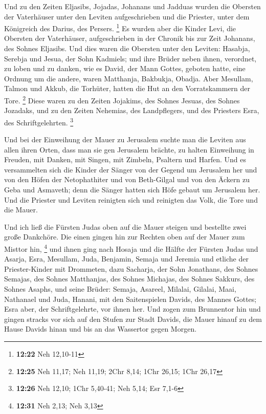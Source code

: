  Und zu den Zeiten Eljasibs, Jojadas, Johanans und Jadduas
wurden die Obersten der Vaterhäuser unter den Leviten aufgeschrieben und
die Priester, unter dem Königreich des Darius, des Persers. \footnote{\textbf{12:22}
  Neh 12,10-11}  Es wurden aber die Kinder Levi, die
Obersten der Vaterhäuser, aufgeschrieben in der Chronik bis zur Zeit
Johanans, des Sohnes Eljasibs.  Und dies waren die Obersten
unter den Leviten: Hasabja, Serebja und Jesua, der Sohn Kadmiels; und
ihre Brüder neben ihnen, verordnet, zu loben und zu danken, wie es
David, der Mann Gottes, geboten hatte, eine Ordnung um die andere,
 waren Matthanja, Bakbukja, Obadja. Aber Mesullam, Talmon
und Akkub, die Torhüter, hatten die Hut an den Vorratskammern der Tore.
\footnote{\textbf{12:25} Neh 11,17; Neh 11,19; 2Chr 8,14; 1Chr 26,15;
  1Chr 26,17}  Diese waren zu den Zeiten Jojakims, des
Sohnes Jesuas, des Sohnes Jozadaks, und zu den Zeiten Nehemias, des
Landpflegers, und des Priesters Esra, des Schriftgelehrten. \footnote{\textbf{12:26}
  Neh 12,10; 1Chr 5,40-41; Neh 5,14; Esr 7,1-6}

 Und bei der Einweihung der Mauer zu Jerusalem suchte man
die Leviten aus allen ihren Orten, dass man sie gen Jerusalem brächte,
zu halten Einweihung in Freuden, mit Danken, mit Singen, mit Zimbeln,
Psaltern und Harfen.  Und es versammelten sich die Kinder
der Sänger von der Gegend um Jerusalem her und von den Höfen der
Netophathiter  und von Beth-Gilgal und von den Äckern zu
Geba und Asmaveth; denn die Sänger hatten sich Höfe gebaut um Jerusalem
her.  Und die Priester und Leviten reinigten sich und
reinigten das Volk, die Tore und die Mauer.

 Und ich ließ die Fürsten Judas oben auf die Mauer steigen
und bestellte zwei große Dankchöre. Die einen gingen hin zur Rechten
oben auf der Mauer zum Misttor hin, \footnote{\textbf{12:31} Neh 2,13;
  Neh 3,13}  und ihnen ging nach Hosaja und die Hälfte der
Fürsten Judas  und Asarja, Esra, Mesullam, 
Juda, Benjamin, Semaja und Jeremia  und etliche der
Priester-Kinder mit Drommeten, dazu Sacharja, der Sohn Jonathans, des
Sohnes Semajas, des Sohnes Matthanjas, des Sohnes Michajas, des Sohnes
Sakkurs, des Sohnes Asaphs,  und seine Brüder: Semaja,
Asareel, Milalai, Gilalai, Maai, Nathanael und Juda, Hanani, mit den
Saitenspielen Davids, des Mannes Gottes; Esra aber, der Schriftgelehrte,
vor ihnen her.  Und zogen zum Brunnentor hin und gingen
stracks vor sich auf den Stufen zur Stadt Davids, die Mauer hinauf zu
dem Hause Davids hinan und bis an das Wassertor gegen Morgen.

